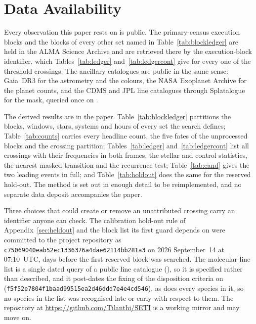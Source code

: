 \section*{Data Availability}
\label{sec:data}
Every observation this paper rests on is public. The \NEB{} primary-census
execution blocks and the blocks of every other set named in
Table~\ref{tab:blockledger} are held in the ALMA Science Archive and are
retrieved there by the execution-block identifier, which
Tables~\ref{tab:ledger} and~\ref{tab:ledgercont} give for every one of the
\EvNCrossRaw{} threshold crossings. The ancillary catalogues are public in the
same sense: Gaia~DR3 for the astrometry and the colours, the NASA Exoplanet
Archive for the planet counts, and the CDMS and JPL line catalogues through
Splatalogue for the mask, queried once on \McQueryDate.

The derived results are in the paper. Table~\ref{tab:blockledger} partitions
the blocks, windows, stars, systems and hours of every set the search defines;
Table~\ref{tab:counts} carries every headline count, the five fates of the
unprocessed blocks and the crossing partition; Tables~\ref{tab:ledger}
and~\ref{tab:ledgercont} list all \EvNCrossRaw{} crossings with their
frequencies in both frames, the stellar and control statistics, the nearest
masked transition and the recurrence test; Table~\ref{tab:cand} gives the two
leading events in full; and Table~\ref{tab:holdout} does the same for the
reserved hold-out. The method is set out in enough detail to be
reimplemented, and no separate data deposit accompanies the paper.

Three choices that could create or remove an unattributed crossing carry an
identifier anyone can check. The
calibration hold-out rule of Appendix~\ref{sec:heldout} and the block list
its first guard depends on were committed to the project repository as
\texttt{c75069040eab52ec1336376a4dae62114bb281a3} on 2026 September~14 at
07:10~UTC, \HoLeadBlockDays{} days before the first reserved block was
searched. The molecular-line list is a single dated query of a public line
catalogue (\McQueryDate), so it is specified rather than
described, and it post-dates the fixing of the disposition criteria on
\MkCritDate{} (\texttt{f5f52e7804f1baad99515ea2d46ddd7e4e4cd546}), as does
every species in it, so no species in the list was recognised late or early
with respect to them. The repository at
\url{https://github.com/Tilanthi/SETI} is a working mirror and may move on.


